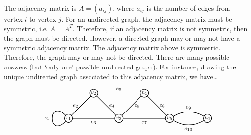 \documentclass[11pt,letterpaper]{article}
\begin{document}
\sol The adjacency matrix is $A= (a_{ij})$, where $a_{ij}$ is the number of edges from vertex $i$ to vertex $j$. For an undirected graph, the adjacency matrix must be symmetric, i.e. $A= A^T$. Therefore, if an adjacency matrix is not symmetric, then the graph must be directed. However, a directed graph may or may not have a symmetric adjacency matrix. The adjacency matrix above is symmetric. Therefore, the graph may or may not be directed. There are many possible answers (but `only one' possible undirected graph). For instance, drawing the unique undirected graph associated to this adjacency matrix, we have\dots
	\[
	\begin{tikzpicture}[scale=1.3]
	\node[draw,inner sep=1pt,minimum size=2pt,line width=0.03cm,circle] at (0, 0)   (a) {\footnotesize$v_1$};
	\node[draw,inner sep=1pt,minimum size=2pt,line width=0.03cm,circle] at (1, 1)   (b) {\footnotesize$v_2$};
	\node[draw,inner sep=1pt,minimum size=2pt,line width=0.03cm,circle] at (2, 0)   (c) {\footnotesize$v_3$};
	\node[draw,inner sep=1pt,minimum size=2pt,line width=0.03cm,circle] at (3, 1)   (d) {\footnotesize$v_4$};
	\node[draw,inner sep=1pt,minimum size=2pt,line width=0.03cm,circle] at (4, 0)   (e) {\footnotesize$v_5$};
	\node[draw,inner sep=1pt,minimum size=2pt,line width=0.03cm,circle] at (5.5, 0)   (f) {\footnotesize$v_6$};

	\path[line width=0.03cm,out=135,in=225,looseness=10] (a) edge node[left] {\footnotesize$e_1$} (a);
	\path[line width=0.03cm] (a) edge node[left] {\footnotesize$e_2$} (b);
	\path[line width=0.03cm] (a) edge node[below] {\footnotesize$e_3$} (c);
	\path[line width=0.03cm] (b) edge node[right] {\footnotesize$e_4$} (c);
	\path[line width=0.03cm] (b) edge node[above] {\footnotesize$e_5$} (d);
	\path[line width=0.03cm] (c) edge node[right] {\footnotesize$e_6$} (d);
	\path[line width=0.03cm] (c) edge node[below] {\footnotesize$e_7$} (e);
	\path[line width=0.03cm] (d) edge node[right] {\footnotesize$e_8$} (e);
	\path[line width=0.03cm, bend left=30] (e) edge node[above] {\footnotesize$e_9$} (f);
	\path[line width=0.03cm, bend right=30] (e) edge node[below] {\footnotesize$e_{10}$} (f);
	\end{tikzpicture}
	\]
\end{document}
